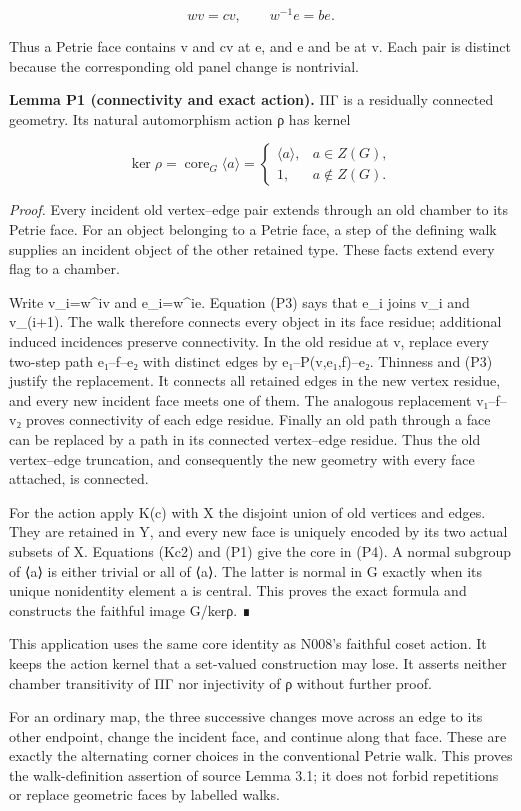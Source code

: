 \documentclass[
  10pt,
  letterpaper,
]{article}
\begin{document}
\[
 wv=cv,\qquad w^{-1}e=be.
 \tag{P3}
\]

Thus a Petrie face contains v and cv at e, and e and be at v. Each pair
is distinct because the corresponding old panel change is nontrivial.

\textbf{Lemma P1 (connectivity and exact action).} ΠΓ is a residually
connected geometry. Its natural automorphism action ρ has kernel

\[
 \ker\rho=\operatorname{core}_G\langle a\rangle
 =\begin{cases}\langle a\rangle,&a\in Z(G),\\1,&a\notin Z(G).\end{cases}
 \tag{P4}
\]

\emph{Proof.} Every incident old vertex--edge pair extends through an
old chamber to its Petrie face. For an object belonging to a Petrie
face, a step of the defining walk supplies an incident object of the
other retained type. These facts extend every flag to a chamber.

Write v\_i=w\^{}iv and e\_i=w\^{}ie. Equation (P3) says that e\_i joins
v\_i and v\_(i+1). The walk therefore connects every object in its face
residue; additional induced incidences preserve connectivity. In the old
residue at v, replace every two-step path e₁--f--e₂ with distinct edges
by e₁--P(v,e₁,f)--e₂. Thinness and (P3) justify the replacement. It
connects all retained edges in the new vertex residue, and every new
incident face meets one of them. The analogous replacement v₁--f--v₂
proves connectivity of each edge residue. Finally an old path through a
face can be replaced by a path in its connected vertex--edge residue.
Thus the old vertex--edge truncation, and consequently the new geometry
with every face attached, is connected.

For the action apply K(c) with X the disjoint union of old vertices and
edges. They are retained in Y, and every new face is uniquely encoded by
its two actual subsets of X. Equations (Kc2) and (P1) give the core in
(P4). A normal subgroup of ⟨a⟩ is either trivial or all of ⟨a⟩. The
latter is normal in G exactly when its unique nonidentity element a is
central. This proves the exact formula and constructs the faithful image
G/kerρ. ∎

This application uses the same core identity as N008's faithful coset
action. It keeps the action kernel that a set-valued construction may
lose. It asserts neither chamber transitivity of ΠΓ nor injectivity of ρ
without further proof.

For an ordinary map, the three successive changes move across an edge to
its other endpoint, change the incident face, and continue along that
face. These are exactly the alternating corner choices in the
conventional Petrie walk. This proves the walk-definition assertion of
source Lemma 3.1; it does not forbid repetitions or replace geometric
faces by labelled walks.
\end{document}
